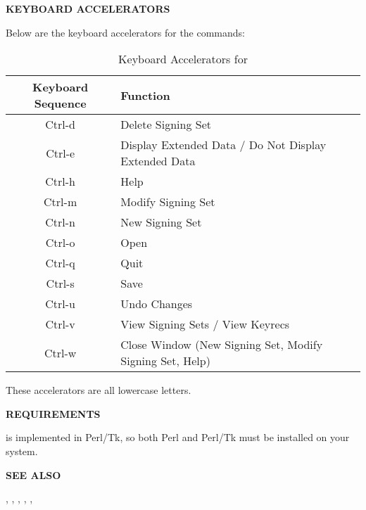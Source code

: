 \clearpage

{\bf KEYBOARD ACCELERATORS}

Below are the keyboard accelerators for the  commands:

\begin{table}[ht]
\caption{Keyboard Accelerators for }
\begin{center}
\begin{tabular}{|c|l|}
\hline
Keyboard Sequence & Function \\
\hline
Ctrl-d & Delete Signing Set \\
Ctrl-e & Display Extended Data / Do Not Display Extended Data \\
Ctrl-h & Help \\
Ctrl-m & Modify Signing Set \\
Ctrl-n & New Signing Set \\
Ctrl-o & Open \\
Ctrl-q & Quit \\
Ctrl-s & Save \\
Ctrl-u & Undo Changes \\
Ctrl-v & View Signing Sets / View Keyrecs \\
Ctrl-w & Close Window (New Signing Set, Modify Signing Set, Help) \\
\hline
\end{tabular} 
\end{center}
\end{table}

These accelerators are all lowercase letters.

{\bf REQUIREMENTS}

 is implemented in Perl/Tk, so both Perl and Perl/Tk must
be installed on your system.

{\bf SEE ALSO}

,
,
,
,
,


